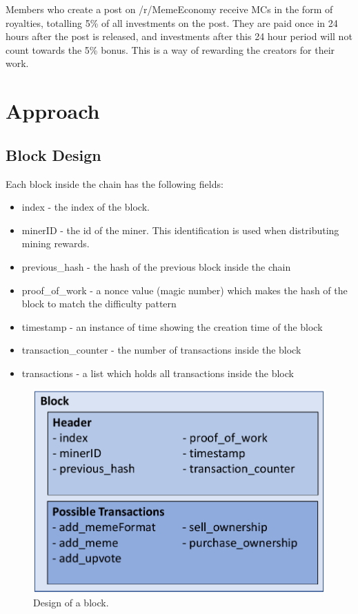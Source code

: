 \documentclass[12pt]{article}
\begin{document}
Members who create a post on /r/MemeEconomy receive \acp{MC} in the form of royalties, totalling 5\% of all investments on the post. They are paid once in 24 hours after the post is released, and investments after this 24 hour period will not count towards the 5\% bonus. This is a way of rewarding the creators for their work.


\section{Approach} \label{sec:Approach}

\subsection{Block Design} \label{sec:BlockDesign} %

Each block inside the chain has the following fields:

\begin{itemize}
  \item index - the index of the block.
  \item minerID - the id of the miner. This identification is used when distributing mining rewards.
  \item previous\_hash - the hash of the previous block inside the chain
  \item proof\_of\_work - a nonce value (magic number) which makes the hash of the block to match the difficulty pattern
  \item timestamp - an instance of time showing the creation time of the block
  \item transaction\_counter - the number of transactions inside the block
  \item transactions - a list which holds all transactions inside the block
\end{itemize}

\begin{figure}[H]
    \centering
    \includegraphics[width=12cm]{../report_MemeEcon/images/block_design.pdf}
    \caption{Design of a block.}
    \label{fig:block_design}
\end{figure}
\end{document}
